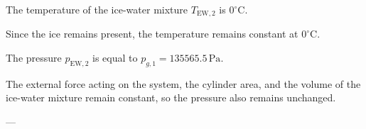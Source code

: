 The temperature of the ice-water mixture \( T_{\text{EW},2} \) is \( 0^\circ\text{C} \).  

Since the ice remains present, the temperature remains constant at \( 0^\circ\text{C} \).  

The pressure \( p_{\text{EW},2} \) is equal to \( p_{g,1} = 135565.5 \, \text{Pa} \).  

The external force acting on the system, the cylinder area, and the volume of the ice-water mixture remain constant, so the pressure also remains unchanged.  

---